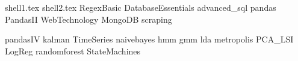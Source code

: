 \documentclass[nociteref]{SIAM-GH-book}
\begin{document}
{shell1.tex}
{shell2.tex}
{RegexBasic}
{DatabaseEssentials}
{advanced_sql}
{pandas}
{PandasII}
{WebTechnology}
{MongoDB}
{scraping}

{pandasIV}
{kalman}
{TimeSeries}
{naivebayes}
{hmm}
{gmm}
{lda}
{metropolis}
{PCA_LSI}
{LogReg}
{randomforest}
{StateMachines}
\end{document}
